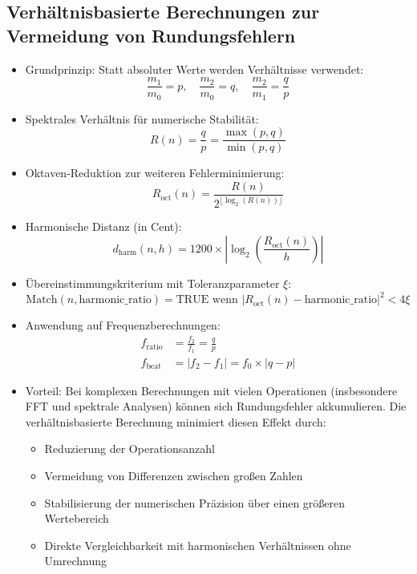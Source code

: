\documentclass[12pt,a4paper]{article}
\begin{document}
	\subsection{Verhältnisbasierte Berechnungen zur Vermeidung von Rundungsfehlern}
	\begin{itemize}
		\item Grundprinzip: Statt absoluter Werte werden Verhältnisse verwendet:
		\begin{equation}
			\frac{m_1}{m_0} = p, \quad \frac{m_2}{m_0} = q, \quad \frac{m_2}{m_1} = \frac{q}{p}
		\end{equation}
		
		\item Spektrales Verhältnis für numerische Stabilität:
		\begin{equation}
			R(n) = \frac{q}{p} = \frac{\max(p,q)}{\min(p,q)}
		\end{equation}
		
		\item Oktaven-Reduktion zur weiteren Fehlerminimierung:
		\begin{equation}
			R_{\text{oct}}(n) = \frac{R(n)}{2^{\lfloor\log_2(R(n))\rfloor}}
		\end{equation}
		
		\item Harmonische Distanz (in Cent):
		\begin{equation}
			d_{\text{harm}}(n,h) = 1200 \times \left|\log_2\left(\frac{R_{\text{oct}}(n)}{h}\right)\right|
		\end{equation}
		
		\item Übereinstimmungskriterium mit Toleranzparameter $\xi$:
		\begin{equation}
			\text{Match}(n, \text{harmonic\_ratio}) = \text{TRUE wenn } |R_{\text{oct}}(n) - \text{harmonic\_ratio}|^2 < 4\xi
		\end{equation}
		
		\item Anwendung auf Frequenzberechnungen:
		\begin{align}
			f_{\text{ratio}} &= \frac{f_2}{f_1} = \frac{q}{p} \\
			f_{\text{beat}} &= |f_2 - f_1| = f_0 \times |q - p|
		\end{align}
		
		\item Vorteil: Bei komplexen Berechnungen mit vielen Operationen (insbesondere FFT und spektrale Analysen) können sich Rundungsfehler akkumulieren. Die verhältnisbasierte Berechnung minimiert diesen Effekt durch:
		\begin{itemize}
			\item Reduzierung der Operationsanzahl
			\item Vermeidung von Differenzen zwischen großen Zahlen
			\item Stabilisierung der numerischen Präzision über einen größeren Wertebereich
			\item Direkte Vergleichbarkeit mit harmonischen Verhältnissen ohne Umrechnung
		\end{itemize}
	\end{itemize}
	
\end{document}
